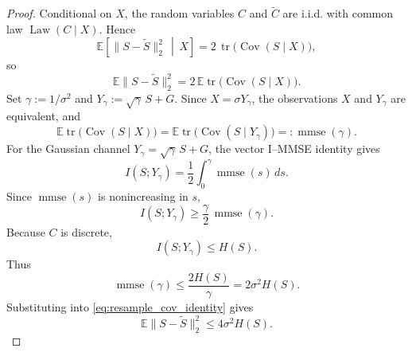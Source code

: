 \documentclass[twoside,11pt]{article}
\DeclareMathOperator{\Cov}{Cov}
\DeclareMathOperator{\tr}{tr}
\DeclareMathOperator{\mmse}{mmse}
\newcommand{\E}{\mathbb{E}}
\newcommand{\Law}{\operatorname{Law}}
\numberwithin{equation}{section}
\begin{document}
\begin{proof}
Conditional on \(X\), the random variables \(C\) and \(\tilde C\) are i.i.d. with common
law \(\Law(C\mid X)\). Hence
\[
\E\!\left[\|S-\tilde S\|_2^2\,\middle|\,X\right]
=
2\,\tr\!\big(\Cov(S\mid X)\big),
\]
so
\begin{equation}
\label{eq:resample_cov_identity}
\E\|S-\tilde S\|_2^2
=
2\,\E\tr\!\big(\Cov(S\mid X)\big).
\end{equation}
Set \(\gamma:=1/\sigma^2\) and \(Y_\gamma:=\sqrt{\gamma}\,S+G\). Since \(X=\sigma Y_\gamma\),
the observations \(X\) and \(Y_\gamma\) are equivalent, and
\[
\E\tr\!\big(\Cov(S\mid X)\big)
=
\E\tr\!\big(\Cov(S\mid Y_\gamma)\big)
=:\mmse(\gamma).
\]
For the Gaussian channel \(Y_\gamma=\sqrt{\gamma}\,S+G\), the vector I--MMSE identity gives
\[
I(S;Y_\gamma)=\frac12\int_0^\gamma \mmse(s)\,ds.
\]
Since \(\mmse(s)\) is nonincreasing in \(s\),
\[
I(S;Y_\gamma)\ge \frac{\gamma}{2}\,\mmse(\gamma).
\]
Because \(C\) is discrete,
\[
I(S;Y_\gamma)\le H(S).
\]
Thus
\[
\mmse(\gamma)\le \frac{2H(S)}{\gamma}=2\sigma^2 H(S).
\]
Substituting into \eqref{eq:resample_cov_identity} gives
\[
\E\|S-\tilde S\|_2^2 \le 4\sigma^2 H(S).
\]
\end{proof}
\end{document}
